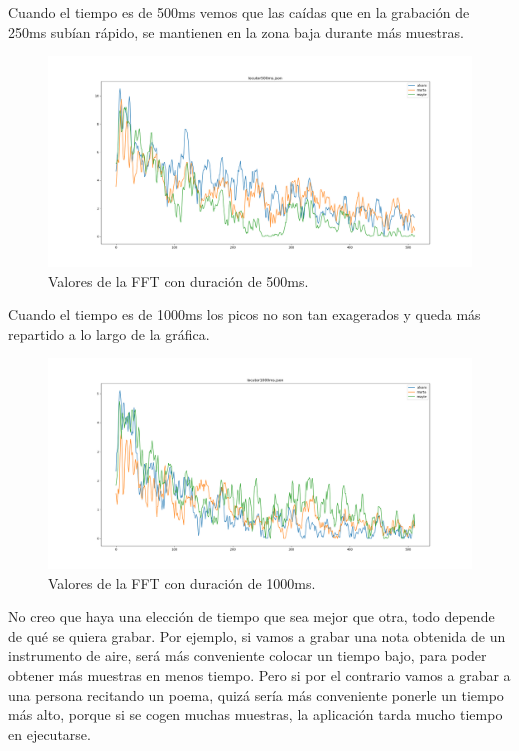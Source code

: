 \documentclass[a4paper, 12pt]{book}
\begin{document}
Cuando el tiempo es de 500ms vemos que las caídas que en la grabación de 250ms subían rápido, se mantienen en la zona baja durante más muestras.

\begin{figure}
	\centering
	\includegraphics[width=12cm, keepaspectratio]{img/locutor500ms.png}
	\caption{Valores de la FFT con duración de 500ms.}\label{fig:locutor500ms}
\end{figure}

Cuando el tiempo es de 1000ms los picos no son tan exagerados y queda más repartido a lo largo de la gráfica.

\begin{figure}
	\centering
	\includegraphics[width=12cm, keepaspectratio]{img/locutor1000ms.png}
	\caption{Valores de la FFT con duración de 1000ms.}\label{fig:locutor1000ms}
\end{figure}

No creo que haya una elección de tiempo que sea mejor que otra, todo depende de qué se quiera grabar. Por ejemplo, si vamos a grabar una nota obtenida de un instrumento de aire, será más conveniente colocar un tiempo bajo, para poder obtener más muestras en menos tiempo. Pero si por el contrario vamos a grabar a una persona recitando un poema, quizá sería más conveniente ponerle un tiempo más alto, porque si se cogen muchas muestras, la aplicación tarda mucho tiempo en ejecutarse.
\end{document}
